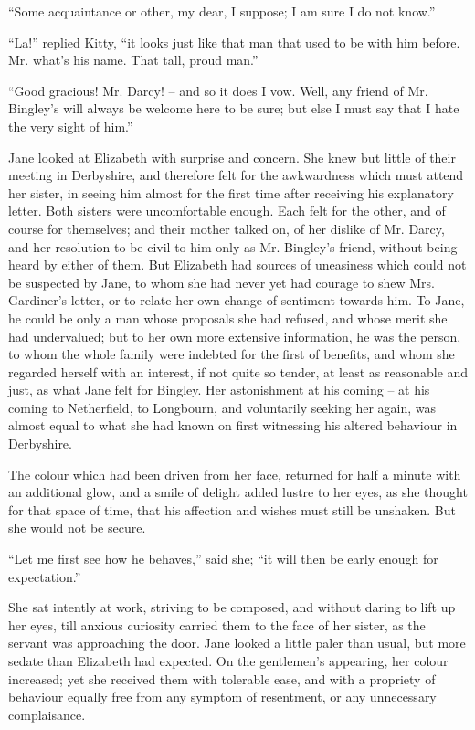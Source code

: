 “Some acquaintance or other, my dear, I suppose;
I am sure I do not know.”

“La!” replied Kitty, “it looks just like that man that
used to be with him before. Mr. what’s his name. That
tall, proud man.”

“Good gracious! Mr. Darcy! -- and so it does I vow.
Well, any friend of Mr. Bingley’s will always be welcome
here to be sure; but else I must say that I hate the very
sight of him.”

Jane looked at Elizabeth with surprise and concern.
She knew but little of their meeting in Derbyshire, and
therefore felt for the awkwardness which must attend
her sister, in seeing him almost for the first time after
receiving his explanatory letter. Both sisters were uncomfortable
enough. Each felt for the other, and of course
for themselves; and their mother talked on, of her dislike
of Mr. Darcy, and her resolution to be civil to him only
as Mr. Bingley’s friend, without being heard by either of
them. But Elizabeth had sources of uneasiness which
could not be suspected by Jane, to whom she had never
yet had courage to shew Mrs. Gardiner’s letter, or to
relate her own change of sentiment towards him. To
Jane, he could be only a man whose proposals she had
refused, and whose merit she had undervalued; but to
her own more extensive information, he was the person,
to whom the whole family were indebted for the first of
benefits, and whom she regarded herself with an interest,
if not quite so tender, at least as reasonable and just, as
what Jane felt for Bingley. Her astonishment at his
coming -- at his coming to Netherfield, to Longbourn, and
voluntarily seeking her again, was almost equal to what
she had known on first witnessing his altered behaviour
in Derbyshire.

The colour which had been driven from her face, returned
for half a minute with an additional glow, and a smile
of delight added lustre to her eyes, as she thought for that
space of time, that his affection and wishes must still be
unshaken. But she would not be secure.

“Let me first see how he behaves,” said she; “it will
then be early enough for expectation.”

She sat intently at work, striving to be composed, and
without daring to lift up her eyes, till anxious curiosity
carried them to the face of her sister, as the servant was
approaching the door. Jane looked a little paler than
usual, but more sedate than Elizabeth had expected.
On the gentlemen’s appearing, her colour increased; yet
she received them with tolerable ease, and with a propriety
of behaviour equally free from any symptom of
resentment, or any unnecessary complaisance.

